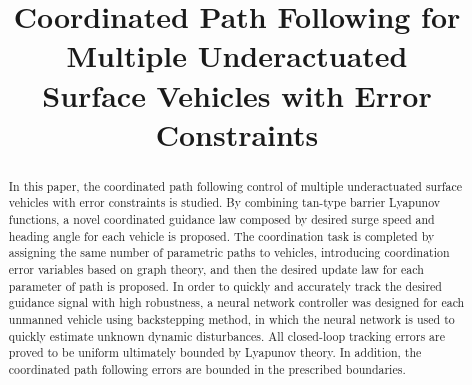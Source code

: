 \documentclass[conference,letterpaper,10.5pt]{IEEEtran}
\begin{document}

\title{\huge Coordinated Path Following for Multiple Underactuated \\Surface Vehicles with Error Constraints}

\author{
}%

\maketitle
\begin{abstract}
In this paper, the coordinated path following control of multiple underactuated surface vehicles with error constraints is studied. By combining tan-type barrier Lyapunov functions, a novel coordinated guidance law composed by desired surge speed and heading angle for each vehicle is proposed. The coordination task is completed by assigning the same number of parametric paths to vehicles, introducing coordination error variables based on graph theory, and then the desired update law for each parameter of path is proposed. In order to quickly and accurately track the desired guidance signal with high robustness, a neural network controller was designed for each unmanned vehicle using backstepping method, in which the neural network is used to quickly estimate unknown dynamic disturbances. All closed-loop tracking errors are proved to be uniform ultimately bounded by Lyapunov theory. In addition, the coordinated path following errors are bounded in the prescribed boundaries.
\\
\end{abstract}
\end{document}
